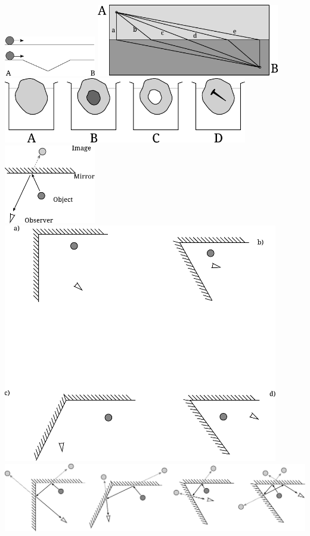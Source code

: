 \documentclass[11pt]{article}
\renewcommand{\=}[1]{\stackrel{#1}{=}}
\begin{document}
\includegraphics[width=0.3\textwidth]{./rolling_balls.pdf}
\clearpage%
\includegraphics[width=0.6\textwidth]{./runners.pdf}
\clearpage%
\includegraphics[width=0.8\textwidth]{./vessels.pdf}
\clearpage%
\includegraphics[width=0.3\textwidth]{./mirrors_question_diag.pdf}
\clearpage%
\includegraphics[width=0.9\textwidth]{./mirrors_question.pdf}
\clearpage%
\renewcommand{\@maketitle}{
\newpage
 \null
 \vskip 2em%
 \begin{center}%
  {\Large \@title \par}%
 \end{center}%
 \par}
\setcounter{section}{0}
\includegraphics[width=1.0\textwidth]{./mirrors_answer.pdf}
\clearpage%
\end{document}
